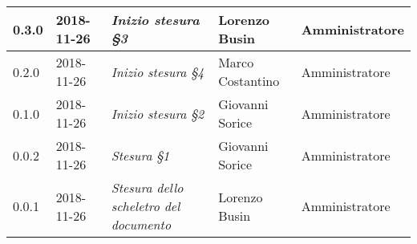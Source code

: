 \begin{longtable}{C{2cm}|C{2.5cm}|C{4.5cm}|C{2.5cm}|C{3cm}}
		0.3.0 & 2018-11-26 & \emph{Inizio stesura §3} & Lorenzo Busin & Amministratore  \\
		\hline
		
		0.2.0 & 2018-11-26 & \emph{Inizio stesura §4} & Marco Costantino & Amministratore  \\
		\hline
		
		0.1.0 & 2018-11-26 & \emph{Inizio stesura §2} & Giovanni Sorice & Amministratore \\
		\hline
		
		0.0.2 & 2018-11-26 & \emph{Stesura §1} & Giovanni Sorice & Amministratore  \\
		\hline
		
		0.0.1 & 2018-11-26 & \emph{Stesura dello scheletro del documento} & Lorenzo Busin & Amministratore \\
	
	
\end{longtable}


\clearpage